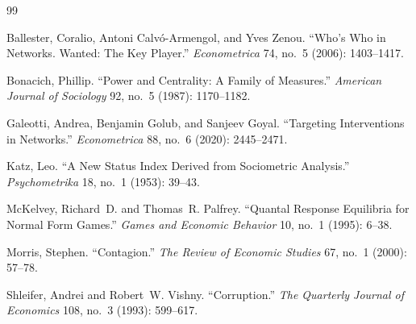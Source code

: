 \documentclass[11pt,letterpaper]{article}
\theoremstyle{plain}
\theoremstyle{definition}
\theoremstyle{remark}
\begin{document}

\begin{thebibliography}{99}

Ballester, Coralio, Antoni Calv\'o-Armengol, and Yves Zenou. ``Who's Who in Networks. Wanted: The Key Player.'' \textit{Econometrica} 74, no.~5 (2006): 1403--1417.

Bonacich, Phillip. ``Power and Centrality: A Family of Measures.'' \textit{American Journal of Sociology} 92, no.~5 (1987): 1170--1182.

Galeotti, Andrea, Benjamin Golub, and Sanjeev Goyal. ``Targeting Interventions in Networks.'' \textit{Econometrica} 88, no.~6 (2020): 2445--2471.

Katz, Leo. ``A New Status Index Derived from Sociometric Analysis.'' \textit{Psychometrika} 18, no.~1 (1953): 39--43.

McKelvey, Richard~D. and Thomas~R. Palfrey. ``Quantal Response Equilibria for Normal Form Games.'' \textit{Games and Economic Behavior} 10, no.~1 (1995): 6--38.

Morris, Stephen. ``Contagion.'' \textit{The Review of Economic Studies} 67, no.~1 (2000): 57--78.

Shleifer, Andrei and Robert~W. Vishny. ``Corruption.'' \textit{The Quarterly Journal of Economics} 108, no.~3 (1993): 599--617.

\end{thebibliography}
\end{document}
